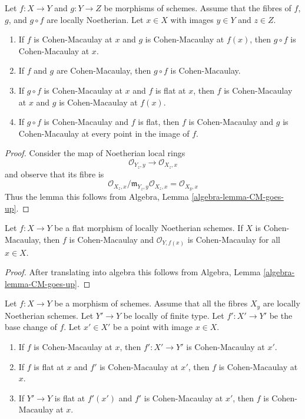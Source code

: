 \begin{lemma}
\label{lemma-composition-CM}
Let $f : X \to Y$ and $g : Y \to Z$ be morphisms of schemes. Assume that the
fibres of $f$, $g$, and $g \circ f$ are locally Noetherian.
Let $x \in X$ with images $y \in Y$ and $z \in Z$.
\begin{enumerate}
\item If $f$ is Cohen-Macaulay at $x$ and $g$ is Cohen-Macaulay
at $f(x)$, then $g \circ f$ is Cohen-Macaulay at $x$.
\item If $f$ and $g$ are Cohen-Macaulay, then $g \circ f$ is Cohen-Macaulay.
\item If $g \circ f$ is Cohen-Macaulay at $x$ and $f$ is flat at $x$,
then $f$ is Cohen-Macaulay at $x$ and $g$ is Cohen-Macaulay at $f(x)$.
\item If $g \circ f$ is Cohen-Macaulay and $f$ is flat, then
$f$ is Cohen-Macaulay and $g$ is Cohen-Macaulay at every point in
the image of $f$.
\end{enumerate}
\end{lemma}

\begin{proof}
Consider the map of Noetherian local rings
$$
\mathcal{O}_{Y_z, y} \to \mathcal{O}_{X_z, x}
$$
and observe that its fibre is
$$
\mathcal{O}_{X_z, x}/\mathfrak m_{Y_z, y}\mathcal{O}_{X_z, x} =
\mathcal{O}_{X_y, x}
$$
Thus the lemma this follows from
Algebra, Lemma \ref{algebra-lemma-CM-goes-up}.
\end{proof}

\begin{lemma}
\label{lemma-flat-morphism-from-CM-scheme}
Let $f : X \to Y$ be a flat morphism of locally Noetherian schemes.
If $X$ is Cohen-Macaulay, then $f$ is Cohen-Macaulay and
$\mathcal{O}_{Y, f(x)}$ is Cohen-Macaulay for all $x \in X$.
\end{lemma}

\begin{proof}
After translating into algebra this follows from
Algebra, Lemma \ref{algebra-lemma-CM-goes-up}.
\end{proof}

\begin{lemma}
\label{lemma-base-change-CM}
Let $f : X \to Y$ be a morphism of schemes.
Assume that all the fibres $X_y$ are locally Noetherian schemes.
Let $Y' \to Y$ be locally of finite type. Let $f' : X' \to Y'$
be the base change of $f$.
Let $x' \in X'$ be a point with image $x \in X$.
\begin{enumerate}
\item If $f$ is Cohen-Macaulay at $x$, then
$f' : X' \to Y'$ is Cohen-Macaulay at $x'$.
\item If $f$ is flat at $x$ and $f'$ is Cohen-Macaulay at $x'$, then $f$
is Cohen-Macaulay at $x$.
\item If $Y' \to Y$ is flat at $f'(x')$ and $f'$ is Cohen-Macaulay at
$x'$, then $f$ is Cohen-Macaulay at $x$.
\end{enumerate}
\end{lemma}

